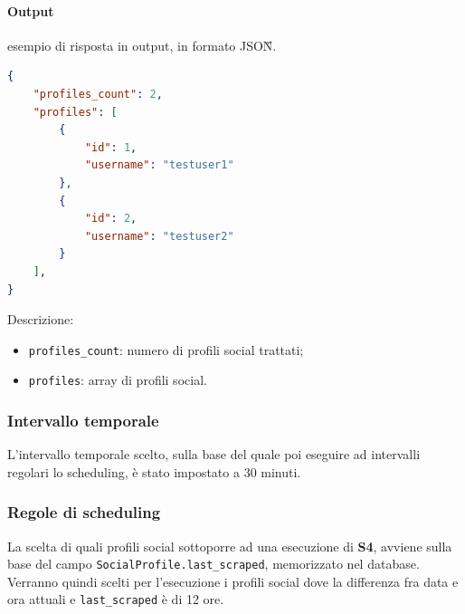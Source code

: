 \paragraph*{Output} esempio di risposta in output, in formato JSON\G{}.
\begin{lstlisting}[language=JSON]
{
    "profiles_count": 2,
    "profiles": [
        {
            "id": 1,
            "username": "testuser1"
        },
        {
            "id": 2,
            "username": "testuser2"
        }
    ],
}
\end{lstlisting}
Descrizione:
\begin{itemize}
    \item \verb|profiles_count|: numero di profili social trattati;
    \item \verb|profiles|: array di profili social. 
\end{itemize}

\subsubsection{Intervallo temporale}
L'intervallo temporale scelto, sulla base del quale poi eseguire ad intervalli regolari lo scheduling,
è stato impostato a 30 minuti.

\subsubsection{Regole di scheduling}
La scelta di quali profili social sottoporre ad una esecuzione di \textbf{S4}, avviene sulla base del
campo \verb|SocialProfile.last_scraped|, memorizzato nel database. Verranno quindi scelti per l'esecuzione
i profili social dove la differenza fra data e ora attuali e \verb|last_scraped| è di 12 ore.

